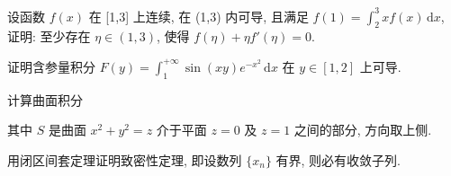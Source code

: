 设函数 $f(x)$ 在 [1,3] 上连续, 在 (1,3) 内可导, 且满足 $f(1) = \int_{2}^{3} x f(x) \, \mathrm{d}x$, 证明: 至少存在 $\eta \in (1,3)$, 使得 $f(\eta) + \eta f'(\eta) = 0$.\par
证明含参量积分 $F(y) = \int_{1}^{+\infty} \sin(xy)e^{-x^2} \, \mathrm{d}x$ 在 $y \in [1,2]$ 上可导.\par
\par{}
计算曲面积分\par
\nopagebreak[4]
其中 $S$ 是曲面 $x^{2} + y^{2} = z$ 介于平面 $z = 0$ 及 $z = 1$ 之间的部分, 方向取上侧.\par
用闭区间套定理证明致密性定理, 即设数列 $\{x_{n}\}$ 有界, 则必有收敛子列.\par
